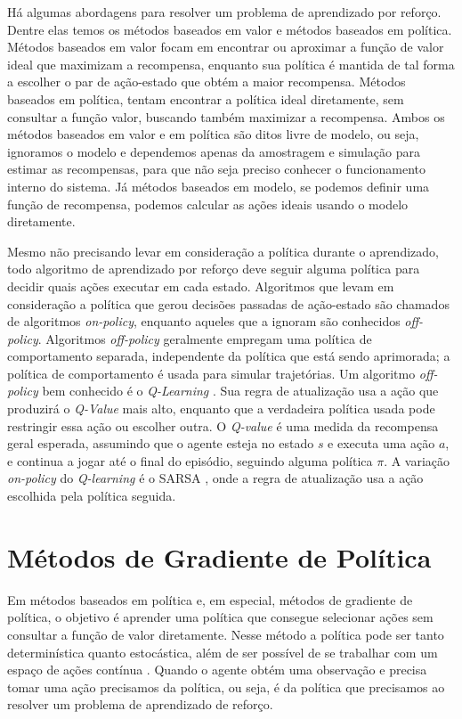 Há algumas abordagens para resolver um problema de aprendizado por reforço. Dentre elas temos os métodos baseados em valor e métodos baseados em política. Métodos baseados em valor focam em encontrar ou aproximar a função de valor ideal que maximizam a recompensa, enquanto sua política é mantida de tal forma a escolher o par de ação-estado que obtém a maior recompensa. Métodos baseados em política, tentam encontrar a política ideal diretamente, sem consultar a função valor, buscando também maximizar a recompensa. Ambos os métodos baseados em valor e em política são ditos livre de modelo, ou seja, ignoramos o modelo e dependemos apenas da amostragem e simulação para estimar as recompensas, para que não seja preciso conhecer o funcionamento interno do sistema. Já métodos baseados em modelo, se podemos definir uma função de recompensa, podemos calcular as ações ideais usando o modelo diretamente. 

Mesmo não precisando levar em consideração a política durante o aprendizado, todo algoritmo de aprendizado por reforço deve seguir alguma política para decidir quais ações executar em cada estado. Algoritmos que levam em consideração a política que gerou decisões passadas de ação-estado são chamados de algoritmos \textit{on-policy}, enquanto aqueles que a ignoram são conhecidos \textit{off-policy}. Algoritmos \textit{off-policy} geralmente empregam uma política de comportamento separada, independente da política que está sendo aprimorada; a política de comportamento é usada para simular trajetórias. Um algoritmo \textit{off-policy} bem conhecido é o \textit{Q-Learning} \cite{Watkins92}. Sua regra de atualização usa a ação que produzirá o \textit{Q-Value} mais alto, enquanto que a verdadeira política usada pode restringir essa ação ou escolher outra. O \textit{Q-value} é uma medida da recompensa geral esperada, assumindo que o agente esteja no estado $s$ e executa uma ação $a$, e continua a jogar até o final do episódio, seguindo alguma política $\pi$. A variação \textit{on-policy} do \textit{Q-learning} é o SARSA \cite{rummery94}, onde a regra de atualização usa a ação escolhida pela política seguida.


\section{Métodos de Gradiente de Política}

Em métodos baseados em política e, em especial, métodos de gradiente de política, o objetivo é aprender uma política que consegue selecionar ações sem consultar a função de valor diretamente. Nesse método a política pode ser tanto determinística quanto estocástica, além de ser possível de se trabalhar com um espaço de ações contínua \cite{Lapan2018}. Quando o agente obtém uma observação e precisa tomar uma ação precisamos da política, ou seja, é da política que precisamos ao resolver um problema de aprendizado de reforço.

